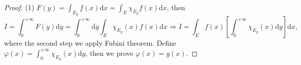 \begin{proof}
  (1) $F(y) = \int_{E_y}f(x)\mathrm{d} x = \int_E \chi_{E_y}f(x)\mathrm{d} x$, then
  \begin{equation}
    I = \int_0^{+\infty} F(y) \mathrm{d} y = \int_0^{+\infty} \mathrm{d} y \int_E \chi_{E_y}(x) f(x)\mathrm{d} x
    \Rightarrow
    I = \int_E f(x) \left[ \int_0^{+\infty} \chi_{E_y}(x) \mathrm{d} y \right]\mathrm{d} x,
  \end{equation}
  where the second step we apply Fubini theorem.
  Define $\varphi(x) = \int_0^{+\infty} \chi_{E_y}(x)\mathrm{d} y$,
  then we prove $\varphi(x) = g(x)$.
\end{proof}



